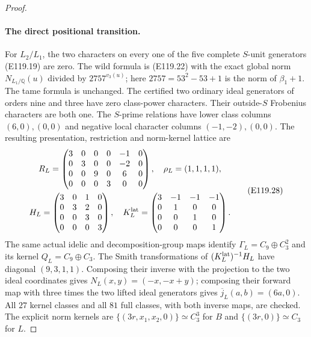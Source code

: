\begin{proof}
\paragraph{The direct positional transition.}
For $L_2/L_1$, the two characters on every one of the five
complete $S$-unit generators (E119.19) are zero.
The wild formula is (E119.22) with the exact global norm
$N_{L_1/\mathbb Q}(u)$ divided by
$2757^{v_3(u)}$; here $2757=53^2-53+1$ is the norm of
$\beta_1+1$. The tame formula is unchanged.
The certified two ordinary ideal generators of orders nine and
three have zero class-power characters. Their outside-$S$
Frobenius characters are both one. The $S$-prime relations
have lower class columns $(6,0),(0,0)$ and negative local
character columns $(-1,-2),(0,0)$.
The resulting presentation, restriction and norm-kernel lattice are
\[
 \begin{gathered}
 R_L=\begin{pmatrix}
 3&0&0&0&-1&0\\0&3&0&0&-2&0\\
 0&0&9&0&6&0\\0&0&0&3&0&0
 \end{pmatrix},\quad
 \rho_L=(1,1,1,1),\\
 H_L=\begin{pmatrix}3&0&1&0\\0&3&2&0\\0&0&3&0\\0&0&0&3\end{pmatrix},\quad
 K_L^{\rm lat}=\begin{pmatrix}3&-1&-1&-1\\0&1&0&0\\0&0&1&0\\0&0&0&1\end{pmatrix}.
 \end{gathered}
 \tag{E119.28}
\]
The same actual idelic and decomposition-group maps identify
$\Gamma_L=C_9\oplus C_3^2$ and its kernel
$Q_L=C_9\oplus C_3$. The Smith transformations of
$(K_L^{\rm lat})^{-1}H_L$ have diagonal $(9,3,1,1)$.
Composing their inverse with the projection to the two ideal
coordinates gives $N_L(x,y)=(-x,-x+y)$; composing their forward
map with three times the two lifted ideal generators gives
$\overline j_L(a,b)=(6a,0)$.
All $27$ kernel classes and all $81$ full classes, with both
inverse maps, are checked. The explicit norm kernels are
$\{(3r,x_1,x_2,0)\}\simeq C_3^3$ for $B$ and
$\{(3r,0)\}\simeq C_3$ for $L$.


\end{proof}
